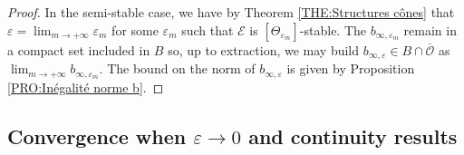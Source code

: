\documentclass{article}
\theoremstyle{remark}
\theoremstyle{definition}
\newcommand{\E}{\mathcal{E}}
\begin{document}
\begin{proof}
In the semi-stable case, we have by Theorem \ref{THE:Structures cônes} that $\varepsilon = \lim_{m \rightarrow +\infty} \varepsilon_m$ for some $\varepsilon_m$ such that $\E$ is $[\Theta_{\varepsilon_m}]$-stable. The $b_{\infty,\varepsilon_m}$ remain in a compact set included in $B$ so, up to extraction, we may build $b_{\infty,\varepsilon} \in B \cap \overline{\mathcal{O}}$ as $\lim_{m \rightarrow +\infty} b_{\infty,\varepsilon_m}$. The bound on the norm of $b_{\infty,\varepsilon}$ is given by Proposition \ref{PRO:Inégalité norme b}.
\end{proof}

\subsection{Convergence when $\varepsilon \rightarrow 0$ and continuity results}
\end{document}

